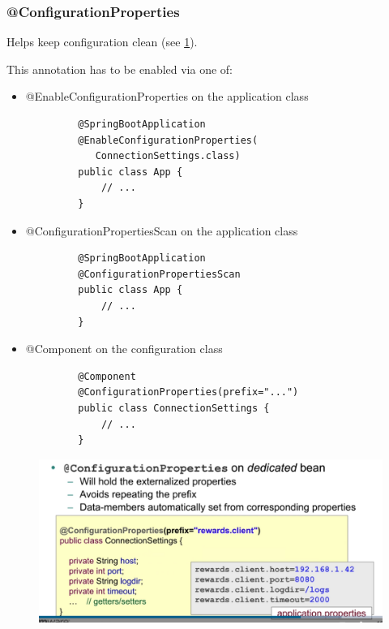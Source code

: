 \documentclass{scrartcl}
\begin{document}
\subsubsection{@ConfigurationProperties}

    Helps keep configuration clean (see \ref{fig:configurationproperties}).

    This annotation has to be enabled via one of:
    \begin{itemize}
        \item @EnableConfigurationProperties on the application class

        \begin{lstlisting}
         @SpringBootApplication
         @EnableConfigurationProperties(
            ConnectionSettings.class)
         public class App {
             // ...
         }
        \end{lstlisting}

        \item @ConfigurationPropertiesScan  on the application class

        \begin{lstlisting}
         @SpringBootApplication
         @ConfigurationPropertiesScan
         public class App {
             // ...
         }
        \end{lstlisting}

        \item @Component on the configuration class

        \begin{lstlisting}
         @Component
         @ConfigurationProperties(prefix="...")
         public class ConnectionSettings {
             // ...
         }
        \end{lstlisting}

    \end{itemize}

\begin{figure}
    \centering
    \includegraphics[width=1\linewidth]{configurationproperties}
    \caption{}
    \label{fig:configurationproperties}
\end{figure}
\end{document}
